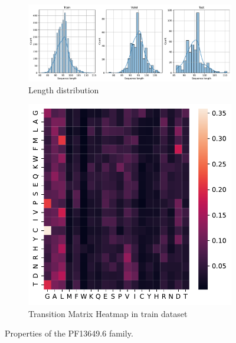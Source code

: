 \documentclass[12pt]{article}
\begin{document}
\begin{figure}[htbp]
    \centering
    \begin{subfigure}{\textwidth}
        \includegraphics[width=\textwidth]{figures/length_seq_13649.pdf}
        \caption{Length distribution}
    \end{subfigure}
    \begin{subfigure}{0.5\textwidth}
        \includegraphics[width=\textwidth]{figures/seq_heatmap_13649.pdf}
        \caption{Transition Matrix Heatmap in train dataset}
        \label{fig:13649_props_hm}
    \end{subfigure}
    \caption{Properties of the PF13649.6 family.}
    \label{fig:13649_props}
\end{figure}
\end{document}
